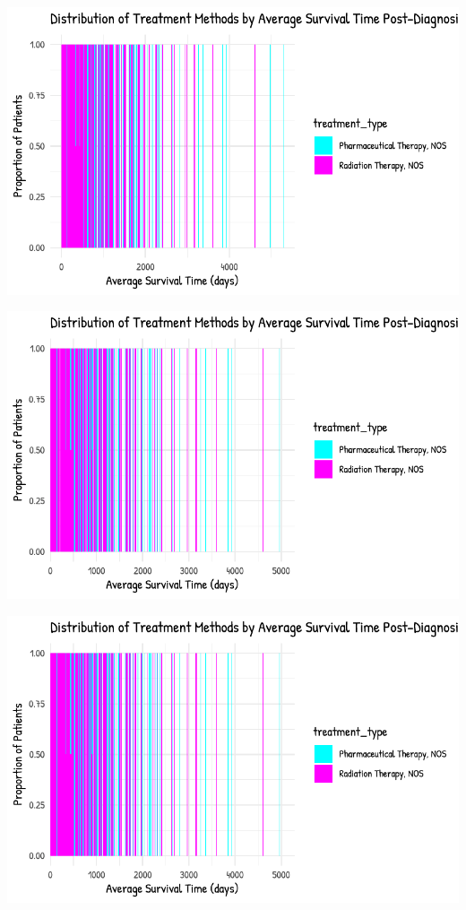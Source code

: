 \documentclass[
  letterpaper,
  DIV=11,
  numbers=noendperiod]{scrartcl}
\begin{document}
\includegraphics{paper_files/figure-pdf/unnamed-chunk-4-14.pdf}

\includegraphics{paper_files/figure-pdf/unnamed-chunk-4-15.pdf}

\includegraphics{paper_files/figure-pdf/unnamed-chunk-4-16.pdf}
\end{document}
